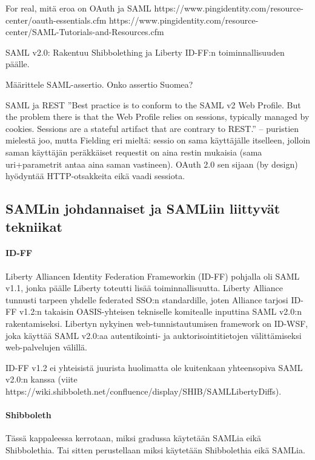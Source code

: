 \documentclass[finnish,gradu]{tktltiki}
\begin{document}
  For real, mitä eroa on OAuth ja SAML
  https://www.pingidentity.com/resource-center/oauth-essentials.cfm
  https://www.pingidentity.com/resource-center/SAML-Tutorials-and-Resources.cfm


  SAML v2.0: Rakentuu Shibbolething ja Liberty ID-FF:n toiminnallisuuden päälle.

  Määrittele SAML-assertio. Onko assertio Suomea?

  SAML ja REST %
  ''Best practice is to conform to the SAML v2 Web Profile. But the problem there is that the Web Profile relies on sessions, typically managed by cookies. Sessions are a stateful artifact that are contrary to REST.'' -- puristien mielestä joo, mutta Fielding eri mieltä: sessio on sama käyttäjälle itselleen, jolloin saman käyttäjän peräkkäiset requestit on aina restin mukaisia (sama uri+parametrit antaa aina saman vastineen).
  OAuth 2.0 sen sijaan (by design) hyödyntää HTTP-otsakkeita eikä vaadi sessiota.

  \subsection{SAMLin johdannaiset ja SAMLiin liittyvät tekniikat} %
  \label{sub:samlin_johdannaiset}


  \paragraph{ID-FF} %
  \label{par:id_ff}
  Liberty Alliancen Identity Federation Frameworkin (ID-FF) pohjalla oli SAML v1.1, jonka päälle Liberty toteutti lisää toiminnallisuutta.
  Liberty Alliance tunnusti tarpeen yhdelle federated SSO:n standardille, joten Alliance tarjosi ID-FF v1.2:n takaisin OASIS-yhteisen tekniselle komitealle inputtina SAML v2.0:n rakentamiseksi.
  Libertyn nykyinen web-tunnistautumisen framework on ID-WSF, joka käyttää SAML v2.0:aa autentikointi- ja auktorisointitietojen välittämiseksi web-palvelujen välillä.

  ID-FF v1.2 ei yhteisistä juurista huolimatta ole kuitenkaan yhteensopiva SAML v2.0:n kanssa (viite https://wiki.shibboleth.net/confluence/display/SHIB/SAMLLibertyDiffs).


  \paragraph{Shibboleth} %
  \label{par:saml_vs_shibboleth}
  Tässä kappaleessa kerrotaan, miksi gradussa käytetään SAMLia eikä Shibbolethia. Tai sitten perustellaan miksi käytetään Shibbolethia eikä SAMLia.
\end{document}
